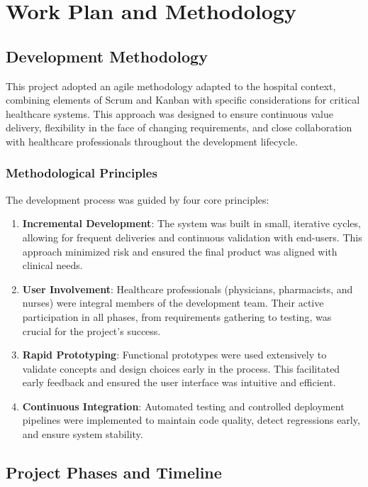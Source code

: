 \chapter{Work Plan and Methodology}

\section{Development Methodology}

This project adopted an agile methodology adapted to the hospital context, combining elements of Scrum and Kanban with specific considerations for critical healthcare systems. This approach was designed to ensure continuous value delivery, flexibility in the face of changing requirements, and close collaboration with healthcare professionals throughout the development lifecycle.

\subsection{Methodological Principles}

The development process was guided by four core principles:

\begin{enumerate}
    \item \textbf{Incremental Development}: The system was built in small, iterative cycles, allowing for frequent deliveries and continuous validation with end-users. This approach minimized risk and ensured the final product was aligned with clinical needs.
    \item \textbf{User Involvement}: Healthcare professionals (physicians, pharmacists, and nurses) were integral members of the development team. Their active participation in all phases, from requirements gathering to testing, was crucial for the project's success.
    \item \textbf{Rapid Prototyping}: Functional prototypes were used extensively to validate concepts and design choices early in the process. This facilitated early feedback and ensured the user interface was intuitive and efficient.
    \item \textbf{Continuous Integration}: Automated testing and controlled deployment pipelines were implemented to maintain code quality, detect regressions early, and ensure system stability.
\end{enumerate}

\section{Project Phases and Timeline}

